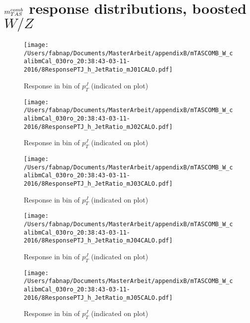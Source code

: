 \clearpage
\onecolumn
\vspace*{\fill}
\section{$m^{comb}_{TAS}$ response distributions, boosted $W/Z$}
\vfill
\clearpage
\twocolumn
 \clearpage %
\begin{figure}

\texttt{[image: /Users/fabnap/Documents/MasterArbeit/appendixB/mTASCOMB\_W\_calibmCal\_030ro\_20:38:43-03-11-2016/8ResponsePTJ\_h\_JetRatio\_mJ01CALO.pdf]}
\caption{Response in bin of  $p_{T}^{J}$ (indicated on plot)} 

\end{figure}

\begin{figure}

\texttt{[image: /Users/fabnap/Documents/MasterArbeit/appendixB/mTASCOMB\_W\_calibmCal\_030ro\_20:38:43-03-11-2016/8ResponsePTJ\_h\_JetRatio\_mJ02CALO.pdf]}
\caption{Response in bin of  $p_{T}^{J}$ (indicated on plot)} 

\end{figure}

\begin{figure}

\texttt{[image: /Users/fabnap/Documents/MasterArbeit/appendixB/mTASCOMB\_W\_calibmCal\_030ro\_20:38:43-03-11-2016/8ResponsePTJ\_h\_JetRatio\_mJ03CALO.pdf]}
\caption{Response in bin of  $p_{T}^{J}$ (indicated on plot)} 

\end{figure}

\begin{figure}

\texttt{[image: /Users/fabnap/Documents/MasterArbeit/appendixB/mTASCOMB\_W\_calibmCal\_030ro\_20:38:43-03-11-2016/8ResponsePTJ\_h\_JetRatio\_mJ04CALO.pdf]}
\caption{Response in bin of  $p_{T}^{J}$ (indicated on plot)} 

\end{figure}

\begin{figure}

\texttt{[image: /Users/fabnap/Documents/MasterArbeit/appendixB/mTASCOMB\_W\_calibmCal\_030ro\_20:38:43-03-11-2016/8ResponsePTJ\_h\_JetRatio\_mJ05CALO.pdf]}
\caption{Response in bin of  $p_{T}^{J}$ (indicated on plot)} 

\end{figure}

